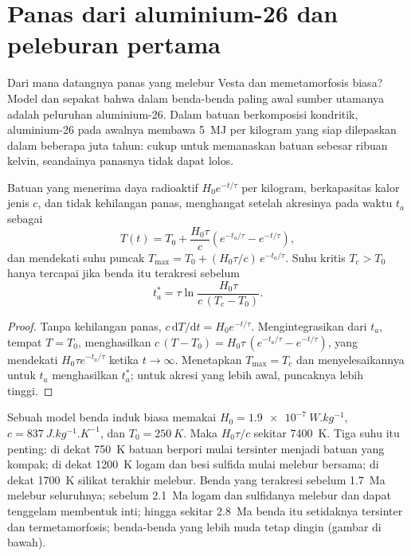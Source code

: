 \section{Panas dari aluminium-26 dan peleburan pertama}

Dari mana datangnya panas yang melebur Vesta dan memetamorfosis 
biasa? Model dan  sepakat bahwa dalam benda-benda paling awal
sumber utamanya adalah peluruhan aluminium-26. Dalam batuan berkomposisi kondritik, aluminium-26 pada awalnya membawa
\qty{5}{MJ} per kilogram yang siap dilepaskan dalam beberapa juta tahun:
cukup untuk memanaskan batuan sebesar ribuan kelvin, seandainya panasnya tidak dapat lolos.

\begin{proposition}
\label{prop:b2:planet-formation-meteorites:heating}
Batuan yang menerima daya radioaktif $H_0 e^{-t/\tau}$ per kilogram, berkapasitas
kalor jenis $c$, dan tidak kehilangan panas, menghangat setelah akresinya pada
waktu $t_a$ sebagai
\[
  T(t) = T_0 + \frac{H_0\tau}{c}\left(e^{-t_a/\tau} - e^{-t/\tau}\right),
\]
dan mendekati suhu puncak
$T_{\max} = T_0 + (H_0\tau/c)\,e^{-t_a/\tau}$. Suhu kritis
$T_c > T_0$ hanya tercapai jika benda itu terakresi sebelum
\[
  t_a^* = \tau\ln\frac{H_0\tau}{c\,(T_c - T_0)}.
\]
\end{proposition}

\begin{proof}
Tanpa kehilangan panas, $c\,\mathrm dT/\mathrm dt = H_0 e^{-t/\tau}$. Mengintegrasikan dari
$t_a$, tempat $T = T_0$, menghasilkan
$c\,(T - T_0) = H_0\tau\,(e^{-t_a/\tau} - e^{-t/\tau})$, yang mendekati
$H_0\tau e^{-t_a/\tau}$ ketika $t \to \infty$. Menetapkan $T_{\max} = T_c$ dan menyelesaikannya
untuk $t_a$ menghasilkan $t_a^*$; untuk akresi yang lebih awal, puncaknya lebih tinggi.
\end{proof}

Sebuah model benda induk  biasa memakai
$H_0 = \qty{1.9e-7}{W.kg^{-1}}$, $c = \qty{837}{J.kg^{-1}.K^{-1}}$, dan
$T_0 = \qty{250}{K}$. Maka $H_0\tau/c$ sekitar \qty{7400}{K}. Tiga
suhu itu penting: di dekat \qty{750}{K} batuan berpori mulai tersinter menjadi batuan
yang kompak; di dekat \qty{1200}{K} logam dan besi sulfida mulai melebur
bersama; di dekat \qty{1700}{K} silikat terakhir melebur. Benda yang terakresi
sebelum \qty{1.7}{Ma} melebur seluruhnya; sebelum \qty{2.1}{Ma} logam dan sulfidanya
melebur dan dapat tenggelam membentuk inti; hingga sekitar \qty{2.8}{Ma} benda itu setidaknya
tersinter dan termetamorfosis; benda-benda yang lebih muda tetap dingin (gambar di bawah).


